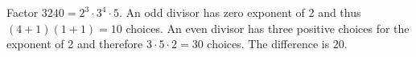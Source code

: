 Factor $3240=2^3\cdot3^4\cdot5$. An odd divisor has zero exponent of 2 and thus $(4+1)(1+1)=10$ choices. An even divisor has three positive choices for the exponent of 2 and therefore $3\cdot5\cdot2=30$ choices. The difference is $\boxed{20}$.
